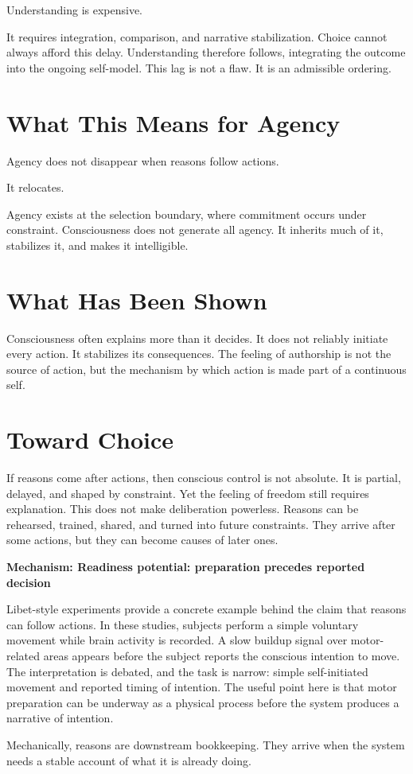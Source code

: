\documentclass[11pt,twoside,openright]{book}
\newenvironment{mechanismbox}[1]
  {\begin{framed}\noindent\textbf{Mechanism: #1}\par\medskip}
  {\end{framed}}
\begin{document}
Understanding is expensive.

It requires integration, comparison, and narrative stabilization. Choice cannot always afford this delay. Understanding therefore follows, integrating the outcome into the ongoing self-model. This lag is not a flaw. It is an admissible ordering.

\section*{What This Means for Agency}

Agency does not disappear when reasons follow actions.

It relocates.

Agency exists at the selection boundary, where commitment occurs under constraint. Consciousness does not generate all agency. It inherits much of it, stabilizes it, and makes it intelligible.

\section*{What Has Been Shown}

Consciousness often explains more than it decides. It does not reliably initiate every action. It stabilizes its consequences. The feeling of authorship is not the source of action, but the mechanism by which action is made part of a continuous self.

\section*{Toward Choice}

If reasons come after actions, then conscious control is not absolute. It is partial, delayed, and shaped by constraint. Yet the feeling of freedom still requires explanation. This does not make deliberation powerless. Reasons can be rehearsed, trained, shared, and turned into future constraints. They arrive after some actions, but they can become causes of later ones.

\begin{mechanismbox}{Readiness potential: preparation precedes reported decision}

Libet-style experiments provide a concrete example behind the claim that reasons can follow actions. In these studies, subjects perform a simple voluntary movement while brain activity is recorded. A slow buildup signal over motor-related areas appears before the subject reports the conscious intention to move. The interpretation is debated, and the task is narrow: simple self-initiated movement and reported timing of intention. The useful point here is that motor preparation can be underway as a physical process before the system produces a narrative of intention.

Mechanically, reasons are downstream bookkeeping. They arrive when the system needs a stable account of what it is already doing.

\end{mechanismbox}
\end{document}

